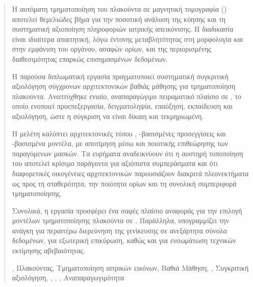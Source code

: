 \begin{abstract}
Η αυτόματη τμηματοποίηση του πλακούντα σε μαγνητική τομογραφία () αποτελεί θεμελιώδες βήμα
για την ποσοτική ανάλυση της κύησης και τη συστηματική αξιοποίηση πληροφοριών
ιατρικής απεικόνισης. Η διαδικασία είναι ιδιαίτερα απαιτητική, λόγω έντονης
μεταβλητότητας στη μορφολογία και στην εμφάνιση του οργάνου, ασαφών ορίων, και
της περιορισμένης διαθεσιμότητας επαρκώς επισημασμένων δεδομένων.

Η παρούσα διπλωματική εργασία πραγματοποιεί συστηματική συγκριτική αξιολόγηση
σύγχρονων αρχιτεκτονικών βαθιάς μάθησης για  τμηματοποίηση πλακούντα.
Αναπτύχθηκε ενιαίο, αναπαραγώγιμο πειραματικό πλαίσιο σε ,
το οποίο ενοποιεί προεπεξεργασία, δειγματοληψία, επαύξηση, εκπαίδευση και
αξιολόγηση, ώστε η σύγκριση να είναι δίκαιη και τεκμηριωμένη.

Η μελέτη καλύπτει αρχιτεκτονικές τύπου , -βασισμένες
προσεγγίσεις και -βασισμένα μοντέλα, με αποτίμηση μέσω
 και ποιοτικής επιθεώρησης των παραγόμενων μασκών. Τα ευρήματα
αναδεικνύουν ότι η αυστηρή τυποποίηση του  αποτελεί κρίσιμο
παράγοντα για αξιόπιστα συμπεράσματα και ότι διαφορετικές οικογένειες
αρχιτεκτονικών παρουσιάζουν διακριτά πλεονεκτήματα ως προς τη σταθερότητα, την
ποιότητα ορίων και τη συνολική συμπεριφορά τμηματοποίησης.

Συνολικά, η εργασία προσφέρει ένα σαφές πλαίσιο αναφοράς για την επιλογή
μοντέλων τμηματοποίησης πλακούντα σε . Παράλληλα, υπογραμμίζει την ανάγκη
για περαιτέρω διερεύνηση της γενίκευσης σε ανεξάρτητα σύνολα δεδομένων, για
εξωτερική επικύρωση, καθώς και για ενσωμάτωση τεχνικών εκτίμησης αβεβαιότητας.

   \begin{keywords}
   , Πλακούντας, Τμηματοποίηση ιατρικών εικόνων, Βαθιά Μάθηση, ,
   Συγκριτική αξιολόγηση, , , ,
   Αναπαραγωγιμότητα
   \end{keywords}
\end{abstract}

